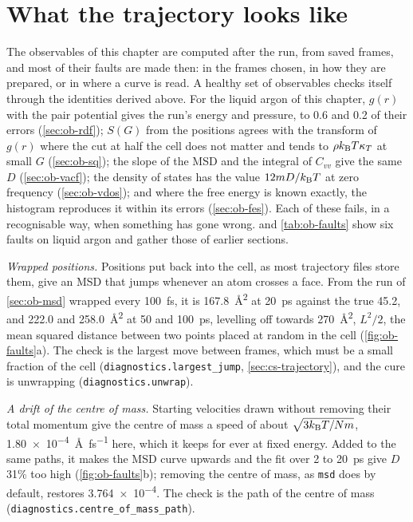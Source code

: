 \section{What the trajectory looks like}
\label{sec:ob-trajectory}

The observables of this chapter are computed after the run, from saved
frames, and most of their faults are made then: in the frames chosen, in
how they are prepared, or in where a curve is read. A healthy set of
observables checks itself through the identities derived above. For the
liquid argon of this chapter, $g(r)$ with the pair potential gives the
run's energy and pressure, to 0.6 and 0.2 of their errors (\cref{sec:ob-rdf}); $S(G)$ from the positions agrees with
the transform of $g(r)$ where the cut at half the cell does not matter
and tends to $\rho k_{\mathrm{B}} T\kappa_T$ at small $G$ (\cref{sec:ob-sq}); the slope
of the MSD and the integral of $C_{vv}$ give the same $D$
(\cref{sec:ob-vacf}); the density of states has the value $12mD/k_{\mathrm{B}} T$
at zero frequency (\cref{sec:ob-vdos}); and where
the free energy is known exactly, the histogram reproduces it within its
errors (\cref{sec:ob-fes}). Each of these fails, in a recognisable way,
when something has gone wrong.  and
\cref{tab:ob-faults} show six faults on liquid argon and gather those of
earlier sections.

\textit{Wrapped positions.} Positions put back into the cell, as most
trajectory files store them, give an MSD that jumps whenever an atom
crosses a face. From the run of \cref{sec:ob-msd} wrapped every
\SI{100}{\femto\second}, it is \SI{167.8}{\angstrom\squared} at
\SI{20}{\pico\second} against the true 45.2, and 222.0 and
\SI{258.0}{\angstrom\squared} at 50 and \SI{100}{\pico\second}, levelling
off towards \SI{270}{\angstrom\squared}, $L^2/2$, the mean squared distance
between two points placed at random in the cell (\cref{fig:ob-faults}a). The check is
the largest move between frames, which must be a small fraction of the
cell (\texttt{diagnostics.largest\_jump}, \cref{sec:cs-trajectory}), and
the cure is unwrapping (\texttt{diagnostics.unwrap}).

\textit{A drift of the centre of mass.} Starting velocities drawn without
removing their total momentum give the centre of mass a speed of about
$\sqrt{3k_{\mathrm{B}} T/Nm}$, \SI{1.80e-4}{\angstrom\per\femto\second} here, which
it keeps for ever at fixed energy. Added to the same paths, it makes
the MSD curve upwards and the fit over 2 to \SI{20}{\pico\second} give $D$
31\% too high (\cref{fig:ob-faults}b); removing the centre of mass, as
\texttt{msd} does by default, restores \num{3.764e-4}. The check is the
path of the centre of mass (\texttt{diagnostics.centre\_of\_mass\_path}).

